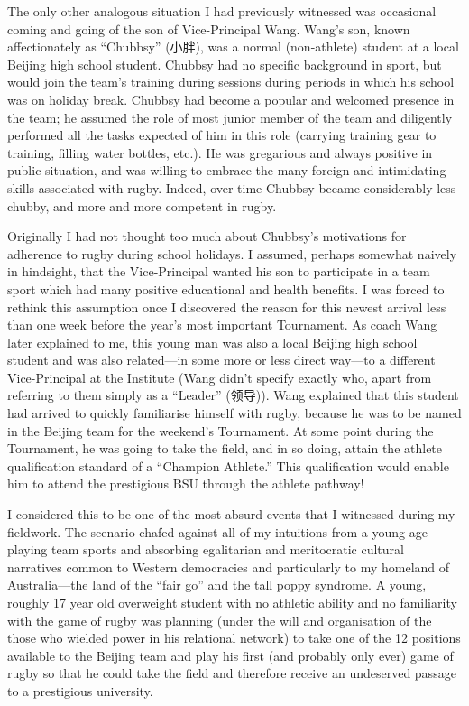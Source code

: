 \begin{CJK}{UTF8}{gbsn}
The only other analogous situation I had previously witnessed was occasional coming and going of the son of Vice-Principal Wang. Wang's son, known affectionately as ``Chubbsy'' (小胖), was a normal (non-athlete) student at a local Beijing high school student.  Chubbsy had no specific background in sport, but would join the team's training during sessions during periods in which his school was on holiday break.  Chubbsy had become a popular and welcomed presence in the team; he assumed the role of most junior member of the team and diligently performed all the tasks expected of him in this role (carrying training gear to training, filling water bottles, etc.). He was gregarious and always positive in public situation, and was willing to embrace the many foreign and intimidating skills associated with rugby. Indeed, over time Chubbsy became considerably less chubby, and more and more competent in rugby.

Originally I had not thought too much about Chubbsy's motivations for adherence to rugby during school holidays.  I assumed, perhaps somewhat naively in hindsight, that the Vice-Principal wanted his son to participate in a team sport which had many positive educational and health benefits.  I was forced to rethink this assumption once I discovered the reason for this newest arrival less than one week before the year's most important Tournament.  As coach Wang later explained to me, this young man was also a local Beijing high school student and was also related---in some more or less direct way---to a different Vice-Principal at the Institute (Wang didn't specify exactly who, apart from referring to them simply as a ``Leader'' (领导)). Wang explained that this student had arrived to quickly familiarise himself with rugby, because he was to be named in the Beijing team for the weekend's Tournament.  At some point during the Tournament, he was going to take the field, and in so doing, attain the athlete qualification standard of a ``Champion Athlete.''  This qualification would enable him to attend the prestigious BSU through the athlete pathway!

I considered this to be one of the most absurd events that I witnessed during my fieldwork.  The scenario chafed against all of my intuitions from a young age playing team sports and absorbing egalitarian and meritocratic cultural narratives common to Western democracies and particularly to my homeland of Australia---the land of the ``fair go'' and the tall poppy syndrome.  A young, roughly 17 year old overweight student with no athletic ability and no familiarity with the game of rugby was planning (under the will and organisation of the those who wielded power in his relational network) to take one of the 12 positions available to the Beijing team and play his first (and probably only ever) game of rugby so that he could take the field and therefore receive an undeserved passage to a prestigious university.


\end{CJK}
